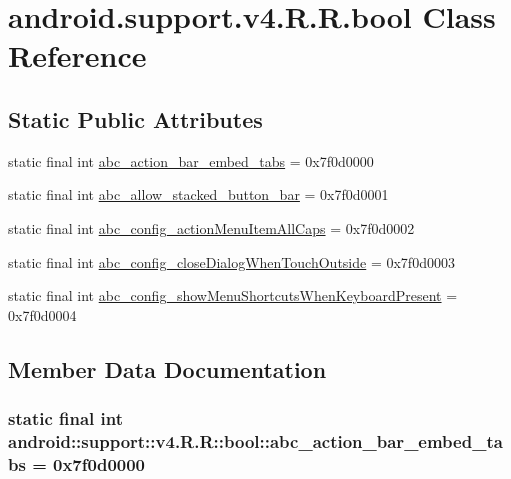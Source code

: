\hypertarget{classandroid_1_1support_1_1v4_1_1_r_1_1bool}{
\section{android.support.v4.R.R.bool Class Reference}
\label{classandroid_1_1support_1_1v4_1_1_r_1_1bool}
}
\subsection*{Static Public Attributes}
\begin{CompactItemize}
\item 
static final int \hyperlink{classandroid_1_1support_1_1v4_1_1_r_1_1bool_2b5e8128f2129b87eae5c02c89f685e6}{abc\_\-action\_\-bar\_\-embed\_\-tabs} = 0x7f0d0000
\item 
static final int \hyperlink{classandroid_1_1support_1_1v4_1_1_r_1_1bool_8738ec9c8afebd42af7c989c4d3289af}{abc\_\-allow\_\-stacked\_\-button\_\-bar} = 0x7f0d0001
\item 
static final int \hyperlink{classandroid_1_1support_1_1v4_1_1_r_1_1bool_0aabc46e1200551f94fe217c25ecad50}{abc\_\-config\_\-actionMenuItemAllCaps} = 0x7f0d0002
\item 
static final int \hyperlink{classandroid_1_1support_1_1v4_1_1_r_1_1bool_df9b16db204ea1a40530da17960c6122}{abc\_\-config\_\-closeDialogWhenTouchOutside} = 0x7f0d0003
\item 
static final int \hyperlink{classandroid_1_1support_1_1v4_1_1_r_1_1bool_f87bda79c26a642dabd3b6b20c4e7af4}{abc\_\-config\_\-showMenuShortcutsWhenKeyboardPresent} = 0x7f0d0004
\end{CompactItemize}


\subsection{Member Data Documentation}
\hypertarget{classandroid_1_1support_1_1v4_1_1_r_1_1bool_2b5e8128f2129b87eae5c02c89f685e6}{
\subsubsection[{abc\_\-action\_\-bar\_\-embed\_\-tabs}]{\setlength{\rightskip}{0pt plus 5cm}static final int android::support::v4.R.R::bool::abc\_\-action\_\-bar\_\-embed\_\-tabs = 0x7f0d0000}}
\label{classandroid_1_1support_1_1v4_1_1_r_1_1bool_2b5e8128f2129b87eae5c02c89f685e6}


